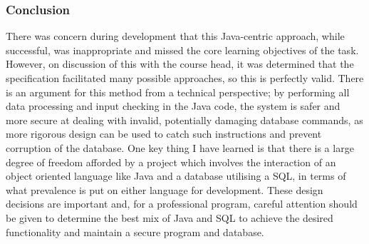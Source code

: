 \documentclass[12pt, oneside]{article}
\begin{document}
\subsubsection*{Conclusion}
There was concern during development that this Java-centric approach, while successful, was inappropriate and missed the core learning objectives of the task. However, on discussion of this with the course head, it was determined that the specification facilitated many possible approaches, so this is perfectly valid. There is an argument for this method from a technical perspective; by performing all data processing and input checking in the Java code, the system is safer and more secure at dealing with invalid, potentially damaging database commands, as more rigorous design can be used to catch such instructions and prevent corruption of the database.\newline \newline
One key thing I have learned is that there is a large degree of freedom afforded by a project which involves the interaction of an object oriented language like Java and a database utilising a SQL, in terms of what prevalence is put on either language for development. These design decisions are important and, for a professional program, careful attention should be given to determine the best mix of Java and SQL to achieve the desired functionality and maintain a secure program and database.
\newpage
\end{document}
